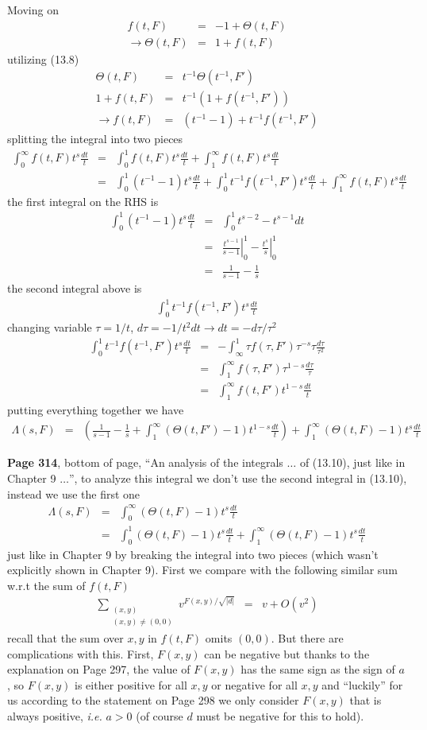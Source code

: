 \documentclass[aps,preprint,preprintnumbers,nofootinbib,showpacs,prd]{revtex4-1}
\newcommand{\ie}{{\it i.e.} }
\newcommand{\nbea}{\begin{eqnarray*}}
\newcommand{\neea}{\end{eqnarray*}}
\begin{document}
Moving on
%
\nbea
f(t,F) & = & -1 + \Theta(t,F) \\
\to \Theta(t,F) & = & 1 + f(t,F)
\neea
%
utilizing (13.8)
%
\nbea
\Theta(t, F) & = & t^{-1}\Theta(t^{-1},F') \\
1 + f(t,F) & = & t^{-1} (1 + f(t^{-1},F')) \\
\to f(t,F) & = & (t^{-1} - 1) + t^{-1}f(t^{-1},F')
\neea
%
splitting the integral into two pieces
%
\nbea
\int_0^\infty f(t,F) t^{s} \frac{dt}{t} & = & \int_0^1 f(t,F) t^{s} \frac{dt}{t} + \int_1^\infty f(t,F) t^{s} \frac{dt}{t} \\
& = & \int_0^1 (t^{-1} - 1) t^{s} \frac{dt}{t} + \int_0^1 t^{-1}f(t^{-1},F')t^s \frac{dt}{t} + \int_1^\infty f(t,F) t^{s} \frac{dt}{t}
\neea
%
the first integral on the RHS is
%
\nbea
\int_0^1 (t^{-1} - 1) t^{s} \frac{dt}{t} & = & \int_0^1 t^{s-2} - t^{s-1} dt \\
& = & \left.\frac{t^{s-1}}{s-1}\right|_{0}^{1} - \left.\frac{t^{s}}{s}\right|_{0}^{1} \\
& = & \frac{1}{s-1} - \frac{1}{s}
\neea
%
the second integral above is
%
\nbea
\int_0^1 t^{-1}f(t^{-1},F')t^s \frac{dt}{t}
\neea
%
changing variable $\tau = 1/t$, $d\tau = -1/t^2 dt \to dt = -d\tau/\tau^2$
%
\nbea
\int_0^1 t^{-1}f(t^{-1},F')t^s \frac{dt}{t} & = & -\int_\infty^1 \tau f(\tau,F') \tau^{-s}\tau \frac{d\tau}{\tau^2} \\
& = & \int_1^\infty f(\tau,F') \tau^{1-s} \frac{d\tau}{\tau} \\
& = & \int_1^\infty f(t,F') t^{1-s} \frac{dt}{t}
\neea
%
putting everything together we have
%
\nbea
\Lambda(s,F) & = & \left(\frac{1}{s-1} - \frac{1}{s} + \int_1^\infty(\Theta(t,F')-1)t^{1-s}\frac{dt}{t} \right) + \int_{1}^\infty (\Theta(t,F)-1)t^s\frac{dt}{t}
\neea
%

{\bf Page 314}, bottom of page, ``An analysis of the integrals $\ldots$ of (13.10), just like in Chapter 9 $\ldots$'', to analyze this integral we don't use the second integral in (13.10), instead we use the first one
%
\nbea
\Lambda(s,F) & = & \int_0^\infty (\Theta(t,F) - 1)t^s \frac{dt}{t} \\
& = & \int_0^1 (\Theta(t,F) - 1)t^s \frac{dt}{t} + \int_1^\infty (\Theta(t,F) - 1)t^s \frac{dt}{t}
\neea
%
just like in Chapter 9 by breaking the integral into two pieces (which wasn't explicitly shown in Chapter 9). First we compare with the following similar sum w.r.t the sum of $f(t,F)$
%
\nbea
\sum_{\substack{(x,y)\\(x,y)\neq(0,0)}} v^{F(x,y)/\sqrt{|d|}} & = & v + O(v^2)
\neea
%
recall that the sum over $x,y$ in $f(t,F)$ omits $(0,0)$. But there are complications with this. First, $F(x,y)$ can be negative but thanks to the explanation on Page 297, the value of $F(x,y)$ has the same sign as the sign of $a$, so $F(x,y)$ is either positive for all $x,y$ or negative for all $x,y$ and ``luckily'' for us according to the statement on Page 298 we only consider $F(x,y)$ that is always positive, \ie $a>0$ (of course $d$ must be negative for this to hold).
\end{document}
